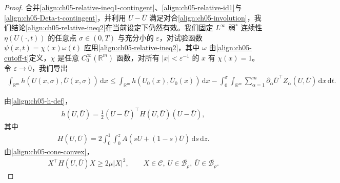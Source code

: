 \documentclass[../../main.tex]{subfiles}
\begin{document}
\begin{proof}
合并\eqref{align:ch05-relative-ineq1-contingent}、\eqref{align:ch05-relative-id1}与\eqref{align:ch05-Deta-t-contingent}，并利用 $U-\bar{U}$ 满足对合\eqref{align:ch05-involution}，我们结论\eqref{align:ch05-relative-ineq2}在当前设定下仍然有效。我们固定 $L^{\infty}$ 弱$^{*}$ 连续性 $\eta(U(\cdot,t))$ 的任意点 $\sigma\in(0,T)$ 与充分小的 $\varepsilon$，对试验函数 $\psi(x,t)=\chi(x)\omega(t)$ 应用\eqref{align:ch05-relative-ineq2}，其中 $\omega$ 由\eqref{align:ch05-cutoff-t}定义，$\chi$ 是任意 $C_{0}^{\infty}(\mathbb{R}^{m})$ 函数，对所有 $|x|<\varepsilon^{-1}$ 的 $x$ 有 $\chi(x)=1$。令 $\varepsilon\to0$，我们导出
\begin{align}
\int_{\mathbb{R}^{m}}h(U(x,\sigma),\bar{U}(x,\sigma))\,\mathrm{d}x
\leqslant\int_{\mathbb{R}^{m}}h(U_{0}(x),\bar{U}_{0}(x))\,\mathrm{d}x-\int_{0}^{\sigma}\int_{\mathbb{R}^{m}}\sum_{\alpha=1}^{m}\partial_{\alpha}\bar{U}^{\top}Z_{\alpha}(U,\bar{U})\,\mathrm{d}x\,\mathrm{d}t.\label{align:ch05-cones-integral}
\end{align}

由\eqref{align:ch05-h-def}，
\begin{align}
h(U,\bar{U})=\frac{1}{2}(U-\bar{U})^{\top}H(U,\bar{U})(U-\bar{U}),\label{align:ch05-h-Hessian}
\end{align}
其中
\begin{align}
H(U,\bar{U})=2\int_{0}^{1}\int_{0}^{z}A(sU+(1-s)\bar{U})\,\mathrm{d}s\,\mathrm{d}z.\label{align:ch05-H-def}
\end{align}
由\eqref{align:ch05-cone-convex}，
\begin{align}
X^{\top}H(U,\bar{U})X\geqslant 2\mu|X|^{2},\qquad X\in\mathscr{C},\ U\in\overline{\mathscr{B}_{\rho}},\ \bar{U}\in\overline{\mathscr{B}_{\rho}}.\label{align:ch05-H-positive}
\end{align}


\end{proof}
\end{document}
